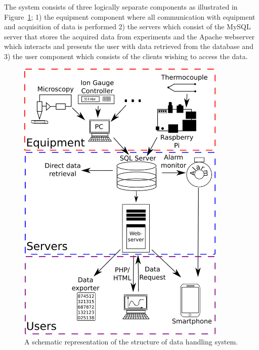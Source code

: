 The system consists of three logically separate components as illustrated in
Figure~\ref{fig:system_overview}; 1) the equipment component where all
communication with equipment and acquisition of data is performed 2) the
servers which consist of the MySQL server that stores the acquired data from
experiments and the Apache webserver which interacts and presents the user with
data retrieved from the database and 3) the user component which consists of
the clients wishing to access the data. 

\begin{figure}
 \begin{center}
 \includegraphics[width=10cm]{system_overview.png}
 \caption{
   A schematic representation of the structure of data handling system.
   \label{fig:system_overview}
 } 
 \end{center}
\end{figure}

